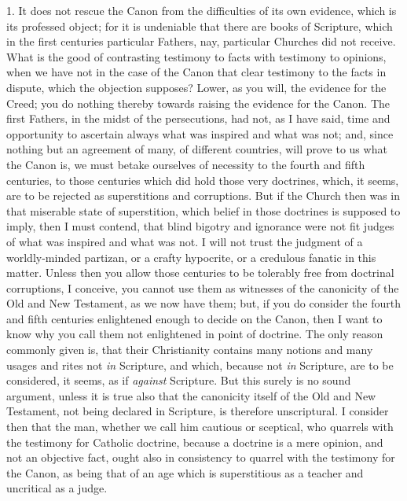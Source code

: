 1. It does not rescue the Canon from the difficulties of its own
evidence, which is its professed object; for it is undeniable that
there are books of Scripture, which in the first centuries particular
Fathers, nay, particular Churches did not receive. What is the good of
contrasting testimony to facts with testimony to opinions, when we
have not in the case of the Canon that clear testimony to the facts in
dispute, which the objection supposes? Lower, as you will, the
evidence for the Creed; you do nothing thereby towards raising the
evidence for the Canon. The first Fathers, in the midst of the
persecutions, had not, as I have said, time and opportunity to
ascertain always what was inspired and what was not; and, since
nothing but an agreement of many, of different countries, will prove
to us what the Canon is, we must betake ourselves of necessity to the
fourth and fifth centuries, to those centuries which did hold those
very doctrines, which, it seems, are to be rejected as superstitions
and corruptions. But if the Church then was in that miserable state of
superstition, which belief in those doctrines is supposed to imply,
then I must contend, that blind bigotry and ignorance were not fit
judges of what was inspired and what was not. I will not trust the
judgment of a worldly-minded partizan, or a crafty hypocrite, or a
credulous fanatic in this matter. Unless then you allow those
centuries to be tolerably free from doctrinal corruptions, I conceive,
you cannot use them as witnesses of the canonicity of the Old and
New Testament, as we now have them; but, if you do consider the
fourth and fifth centuries enlightened enough to decide on the Canon,
then I want to know why you call them not enlightened in point of
doctrine. The only reason commonly given is, that their Christianity
contains many notions and many usages and rites not \emph{in}
Scripture, and which, because not \emph{in} Scripture, are to be
considered, it seems, as if \emph{against} Scripture. But this surely
is no sound argument, unless it is true also that the canonicity
itself of the Old and New Testament, not being declared in Scripture,
is therefore unscriptural. I consider then that the man, whether we
call him cautious or sceptical, who quarrels with the testimony for
Catholic doctrine, because a doctrine is a mere opinion, and not an
objective fact, ought also in consistency to quarrel with the
testimony for the Canon, as being that of an age which is
superstitious as a teacher and uncritical as a judge.

